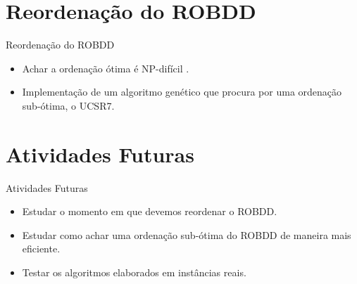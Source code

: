\documentclass{beamer}
\begin{document}
\section{Reordenação do ROBDD}
\begin{frame}{Reordenação do ROBDD}
    \begin{itemize}
        \item{Achar a ordenação ótima é NP-difícil \cite{bollig}.}
        \item{Implementação de um algoritmo genético que procura por
            uma ordenação sub-ótima, o UCSR7.}

\begin{table}[ht] \begin{center}
\end{center} \end{table}        
\end{itemize}
\end{frame}

\section{Atividades Futuras}
\begin{frame}{Atividades Futuras}
    \begin{itemize}
        \item{Estudar o momento em que devemos reordenar o ROBDD.}
        \item{Estudar como achar uma ordenação sub-ótima do ROBDD
            de maneira mais eficiente.}
        \item{Testar os algoritmos elaborados em instâncias reais.}
    \end{itemize}
\end{frame}
\end{document}
